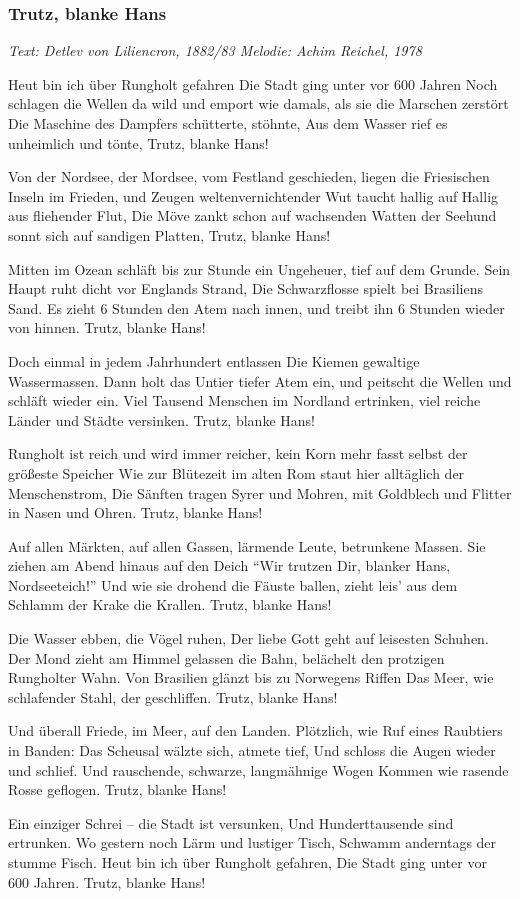 \documentclass[a5paper,pagesize,twoside,10pt,headings=small]{scrartcl}
\newcommand\songheader[3][]{%
    \subsubsection*{\centering #2}\vspace{0.5\baselineskip}%
    \addcontentsline{toc}{subsection}{#2}
    \centering \textit{#3}\\%
    \vspace{\baselineskip}\par%
}
\newenvironment{myguitar}{\begin{guitar}}{\clearpage\end{guitar}}
\begin{document}
\songheader{Trutz, blanke Hans}{Text: Detlev von Liliencron, 1882/83 \quad Melodie: Achim Reichel, 1978}
\begin{myguitar}%
Heut bin ich über Rungholt gefahren
Die Stadt ging unter vor 600 Jahren
Noch schlagen die Wellen da wild und emport
wie damals, als sie die Marschen zerstört
Die Maschine des Dampfers schütterte, stöhnte, 
Aus dem Wasser rief es unheimlich und tönte,
Trutz, blanke Hans!

Von der Nordsee, der Mordsee, vom Festland geschieden,
liegen die Friesischen Inseln im Frieden,
und Zeugen weltenvernichtender Wut
taucht hallig auf Hallig aus fliehender Flut,
Die Möve zankt schon auf wachsenden Watten
der Seehund sonnt sich auf sandigen Platten,
Trutz, blanke Hans!

Mitten im Ozean schläft bis zur Stunde
ein Ungeheuer, tief auf dem Grunde.
Sein Haupt ruht dicht vor Englands Strand,
Die Schwarzflosse spielt bei Brasiliens Sand.
Es zieht 6 Stunden den Atem nach innen,
und treibt ihn 6 Stunden wieder von hinnen.
Trutz, blanke Hans!

Doch einmal in jedem Jahrhundert entlassen
Die Kiemen gewaltige Wassermassen.
Dann holt das Untier tiefer Atem ein,
und peitscht die Wellen und schläft wieder ein.
Viel Tausend Menschen im Nordland ertrinken,
viel reiche Länder und Städte versinken.
Trutz, blanke Hans!

Rungholt ist reich und wird immer reicher,
kein Korn mehr fasst selbst der größeste Speicher
Wie zur Blütezeit im alten Rom
staut hier alltäglich der Menschenstrom,
Die Sänften tragen Syrer und Mohren,
mit Goldblech und Flitter in Nasen und Ohren.
Trutz, blanke Hans!

Auf allen Märkten, auf allen Gassen,
lärmende Leute, betrunkene Massen.
Sie ziehen am Abend hinaus auf den Deich
"`Wir trutzen Dir, blanker Hans, Nordseeteich!"'
Und wie sie drohend die Fäuste ballen,
zieht leis' aus dem Schlamm der Krake die Krallen.
Trutz, blanke Hans!

Die Wasser ebben, die Vögel ruhen,
Der liebe Gott geht auf leisesten Schuhen.
Der Mond zieht am Himmel gelassen die Bahn,
belächelt den protzigen Rungholter Wahn.
Von Brasilien glänzt bis zu Norwegens Riffen
Das Meer, wie schlafender Stahl, der geschliffen.
Trutz, blanke Hans!

Und überall Friede, im Meer, auf den Landen.
Plötzlich, wie Ruf eines Raubtiers in Banden:
Das Scheusal wälzte sich, atmete tief,
Und schloss die Augen wieder und schlief.
Und rauschende, schwarze, langmähnige Wogen
Kommen wie rasende Rosse geflogen.
Trutz, blanke Hans!

Ein einziger Schrei -- die Stadt ist versunken,
Und Hunderttausende sind ertrunken.
Wo gestern noch Lärm und lustiger Tisch,
Schwamm anderntags der stumme Fisch.
Heut bin ich über Rungholt gefahren,
Die Stadt ging unter vor 600 Jahren.
Trutz, blanke Hans!
\end{myguitar}
\end{document}
